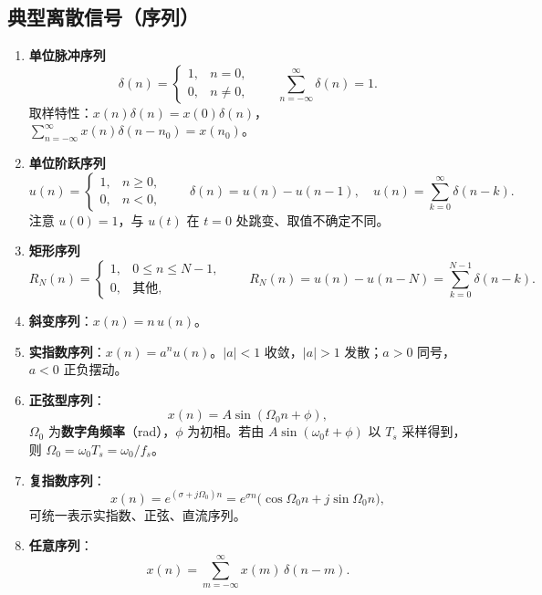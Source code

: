 \subsection{典型离散信号（序列）}

\begin{enumerate}
\item \textbf{单位脉冲序列}
\begin{equation}
\delta(n)=\begin{cases}1, & n=0,\\ 0, & n\ne0,\end{cases}
\qquad \sum_{n=-\infty}^{\infty}\delta(n)=1 .
\end{equation}
取样特性：$x(n)\delta(n)=x(0)\delta(n)$，
$\sum\limits_{n=-\infty}^{\infty}x(n)\delta(n-n_0)=x(n_0)$。

\item \textbf{单位阶跃序列}
\begin{equation}
u(n)=\begin{cases}1, & n\ge0,\\ 0, & n<0,\end{cases}
\qquad \delta(n)=u(n)-u(n-1),\quad u(n)=\sum_{k=0}^{\infty}\delta(n-k).
\end{equation}
注意 $u(0)=1$，与 $u(t)$ 在 $t=0$ 处跳变、取值不确定不同。

\item \textbf{矩形序列}
\begin{equation}
R_N(n)=\begin{cases}1, & 0\le n\le N-1,\\ 0, & \text{其他},\end{cases}
\qquad R_N(n)=u(n)-u(n-N)=\sum_{k=0}^{N-1}\delta(n-k).
\end{equation}

\item \textbf{斜变序列}：$x(n)=n\,u(n)$。

\item \textbf{实指数序列}：$x(n)=a^n u(n)$。$|a|<1$ 收敛，$|a|>1$ 发散；$a>0$ 同号，$a<0$ 正负摆动。

\item \textbf{正弦型序列}：
\begin{equation}
x(n)=A\sin(\Omega_0 n+\phi),
\end{equation}
$\Omega_0$ 为\textbf{数字角频率}（rad），$\phi$ 为初相。若由 $A\sin(\omega_0t+\phi)$ 以 $T_s$ 采样得到，
则 $\Omega_0=\omega_0T_s=\omega_0/f_s$。

\item \textbf{复指数序列}：
\begin{equation}
x(n)=e^{(\sigma+j\Omega_0)n}=e^{\sigma n}\big(\cos\Omega_0 n+j\sin\Omega_0 n\big),
\end{equation}
可统一表示实指数、正弦、直流序列。

\item \textbf{任意序列}：
\begin{equation}
x(n)=\sum_{m=-\infty}^{\infty}x(m)\,\delta(n-m).
\end{equation}
\end{enumerate}

